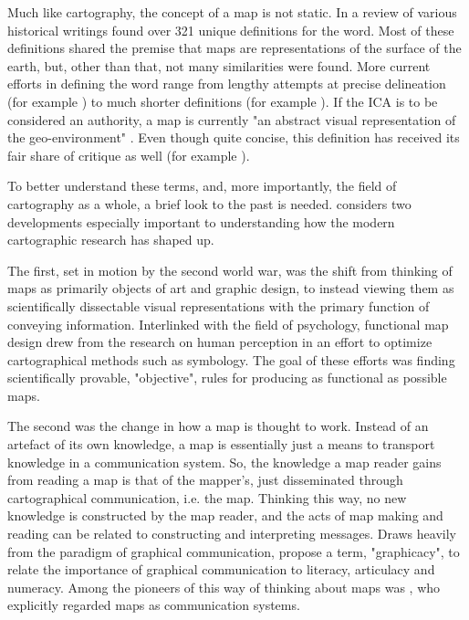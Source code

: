 Much like cartography, the concept of a map is not static.
In a review of various historical writings \textcite{and1996}
found over 321 unique definitions for the word.
Most of these definitions shared the premise that
maps are representations of the surface of the earth,
but, other than that, not many similarities were found.
More current efforts in defining the word range
from lengthy attempts at precise delineation (for example \textcite{ica2003})
to much shorter definitions (for example \textcite{kra2017}).
If the ICA is to be considered an authority, a map is currently
"an abstract visual representation of the geo-environment" \parencite{ica2019}.
Even though quite concise, this definition has received its fair share of critique as well
(for example \textcite{lap2021}).

To better understand these terms,
and, more importantly, the field of cartography as a whole,
a brief look to the past is needed.
\textcite{mac2004} considers two developments especially important
to understanding how the modern cartographic research has shaped up.

The first, set in motion by the second world war, was
the shift from thinking of maps as primarily objects of art and graphic design,
to instead viewing them as scientifically dissectable visual representations
with the primary function of conveying information.
Interlinked with the field of psychology,
functional map design drew from the research on human perception
in an effort to optimize cartographical methods such as symbology.
The goal of these efforts was finding scientifically provable, "objective", rules
for producing as functional as possible maps.

The second was the change in how a map is thought to work.
Instead of an artefact of its own knowledge,
a map is essentially just a means to transport knowledge in a communication system.
So, the knowledge a map reader gains from reading a map is that of the mapper's,
just disseminated through cartographical communication, i.e. the map.
Thinking this way, no new knowledge is constructed by the map reader,  %
and the acts of map making and reading can be related to constructing and interpreting messages.
Draws heavily from the paradigm of graphical communication,  %
\textcite{bal1966} propose a term, "graphicacy",
to relate the importance of graphical communication to literacy, articulacy and numeracy.
Among the pioneers of this way of thinking about maps was \textcite{kol1969},
who explicitly regarded maps as communication systems.

